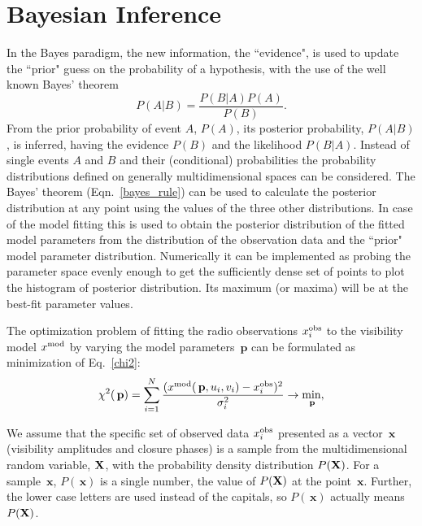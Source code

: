 \documentclass[preprint2]{aastex}
\newcommand{\bp}{\,\mathbf{p}}
\newcommand{\bx}{\,\mathbf{x}}
\begin{document}
\section{Bayesian Inference}

In the Bayes paradigm, the new information, the ``evidence", is used to update the ``prior" guess on the probability of a hypothesis, with the use of the well known Bayes' theorem
\begin{equation}
  \label{bayes_rule}
  P(A|B) =  \frac{P(B|A)P(A)}{P(B)}.
\end{equation}
From the prior probability of event $A$, $P(A)$, its posterior probability, $P(A|B)$, is inferred, having the evidence $P(B)$ and the likelihood $P(B|A)$. Instead of single events $A$ and $B$ and their (conditional) probabilities the probability distributions defined on generally multidimensional spaces can be considered. The Bayes' theorem (Eqn.~\eqref{bayes_rule}) can be used to calculate the posterior distribution at any point using the values of the three other distributions. In case of the model fitting this is used to obtain the posterior distribution of the fitted model parameters from the distribution of the observation data and the ``prior" model parameter distribution. Numerically it can be implemented as  probing the parameter space evenly enough to get the sufficiently dense set of points to plot the histogram of posterior distribution. Its maximum (or maxima) will be at the best-fit parameter values.

The optimization problem of fitting the radio observations $x_i^{\rm obs}$ to the visibility model $x^{\rm mod}$ by varying the model parameters $\bp$ can be formulated as minimization of Eq.~\eqref{chi2}:
\begin{equation*}
  \label{chi2_nonumber}
  \chi^2(\bp) = \sum_{i=1}^{N} \frac{(x^{\rm mod}(\bp,u_i,v_i) - x_i^{\rm obs})^2}{\sigma_i^2}  \rightarrow {\min\limits_{\bp}},
\end{equation*}

We assume that the specific set of observed data $x_i^{\rm obs}$ presented as a vector $\bx$ (visibility amplitudes and closure phases) is a sample from the multidimensional random variable, ${\bf X}$, with the probability density distribution $P({\bf X})$. For a sample $\bx$, $P(\bx)$ is a single number, the value of $P({\bf X})$ at the point $\bx$. Further, the lower case letters are used instead of the capitals, so $P(\bx)$ actually means $P({\bf X})$.
\end{document}
